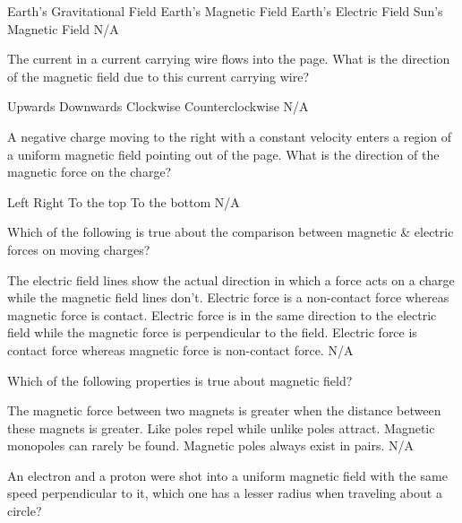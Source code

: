 \documentclass[12pt,addpoints]{exam}
\begin{document}
{{{\begin{questions}
\begin{oneparchoices}
 					 	\choice Earth's Gravitational Field
 						\choice Earth's Magnetic Field
 						\choice Earth's Electric Field
 						\choice Sun's Magnetic Field
 						\choice N/A
 					\end{oneparchoices}
 					\question The current in a current carrying wire flows into the page. What is the direction of the
 					magnetic field due to this current carrying wire? \\ \begin{oneparchoices}
 						\choice Upwards
 						\choice Downwards
 						\choice Clockwise
 						\choice Counterclockwise
 						\choice N/A
 					\end{oneparchoices}
 					\question A negative charge moving to the right with a constant velocity enters a region of a uniform magnetic field pointing out of the page. What is the direction of the magnetic force on the charge?\\ \begin{oneparchoices}
 						\choice Left
 						\choice Right
 						\choice To the top
 						\choice To the bottom
 						\choice N/A
 					\end{oneparchoices}	
 					\question Which of the following is true about the comparison between magnetic \& electric forces on moving charges? \begin{choices}
 						\choice The electric field lines show the actual direction in which a force acts on a charge while the magnetic field lines don't.
 						\choice Electric force is a non-contact force whereas magnetic force is contact.
 						\choice Electric force is in the same direction to the electric field while the magnetic force is perpendicular to the field. 
 						\choice Electric force is contact force whereas magnetic force is non-contact force.
 						\choice N/A
 					\end{choices}
 					\question Which of the following properties is true about magnetic field?\begin{choices}
 						\choice The magnetic force between two magnets is greater when the distance between these magnets is greater.
 						\choice Like poles repel while unlike poles attract.
 						\choice Magnetic monopoles can rarely be found. 
 						\choice Magnetic poles always exist in pairs.
 						\choice N/A
 					\end{choices}
 					\question An electron and a proton were shot into a uniform magnetic field with the same speed perpendicular to it, which one has a lesser radius when traveling about a circle?\begin{choices}

\end{choices}
\end{questions}}}}
\end{document}
